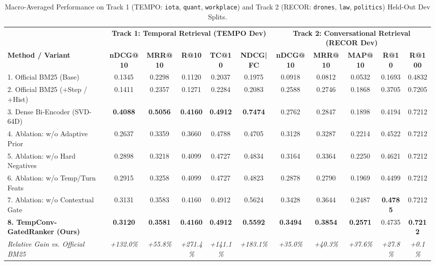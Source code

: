 \documentclass[10pt,twocolumn]{article}
\begin{document}
\begin{table}[t]
\centering
\caption{Macro-Averaged Performance on Track 1 (TEMPO: \texttt{iota}, \texttt{quant}, \texttt{workplace}) and Track 2 (RECOR: \texttt{drones}, \texttt{law}, \texttt{politics}) Held-Out Dev Splits.}
\label{tab:main}
\small
\begin{tabular}{l|ccccc|ccccc}
\toprule
& \multicolumn{5}{c|}{\textbf{Track 1: Temporal Retrieval (TEMPO Dev)}} & \multicolumn{5}{c}{\textbf{Track 2: Conversational Retrieval (RECOR Dev)}} \\
\textbf{Method / Variant} & \textbf{nDCG@10} & \textbf{MRR@10} & \textbf{R@10} & \textbf{TC@10} & \textbf{NDCG|FC} & \textbf{nDCG@10} & \textbf{MRR@10} & \textbf{MAP@10} & \textbf{R@10} & \textbf{R@100} \\
\midrule
1. Official BM25 (Base) & 0.1345 & 0.2298 & 0.1120 & 0.2037 & 0.1975 & 0.0918 & 0.0812 & 0.0532 & 0.1693 & 0.4832 \\
2. Official BM25 (+Step / +Hist) & 0.1411 & 0.2357 & 0.1271 & 0.2284 & 0.2083 & 0.2588 & 0.2746 & 0.1868 & 0.3705 & 0.7205 \\
3. Dense Bi-Encoder (SVD-64D) & \textbf{0.4088} & \textbf{0.5056} & \textbf{0.4160} & \textbf{0.4912} & \textbf{0.7474} & 0.2762 & 0.2847 & 0.1898 & 0.4194 & 0.7212 \\
\midrule
4. Ablation: w/o Adaptive Prior & 0.2637 & 0.3359 & 0.3660 & 0.4788 & 0.4705 & 0.3128 & 0.3287 & 0.2214 & 0.4522 & 0.7212 \\
5. Ablation: w/o Hard Negatives & 0.2898 & 0.3218 & 0.4099 & 0.4727 & 0.4834 & 0.3164 & 0.3364 & 0.2250 & 0.4621 & 0.7212 \\
6. Ablation: w/o Temp/Turn Feats & 0.2915 & 0.3258 & 0.4099 & 0.4727 & 0.4823 & 0.2878 & 0.2790 & 0.1969 & 0.4499 & 0.7212 \\
7. Ablation: w/o Contextual Gate & 0.3131 & 0.3583 & 0.4160 & 0.4912 & 0.5624 & 0.3428 & 0.3644 & 0.2487 & \textbf{0.4785} & 0.7212 \\
\textbf{8. TempConv-GatedRanker (Ours)} & \textbf{0.3120} & \textbf{0.3581} & \textbf{0.4160} & \textbf{0.4912} & \textbf{0.5592} & \textbf{0.3494} & \textbf{0.3854} & \textbf{0.2571} & 0.4735 & \textbf{0.7212} \\
\midrule
\emph{Relative Gain vs. Official BM25} & \emph{+132.0\%} & \emph{+55.8\%} & \emph{+271.4\%} & \emph{+141.1\%} & \emph{+183.1\%} & \emph{+35.0\%} & \emph{+40.3\%} & \emph{+37.6\%} & \emph{+27.8\%} & \emph{+0.1\%} \\
\bottomrule
\end{tabular}
\end{table}
\end{document}
